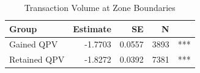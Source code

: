 \begin{table}

\caption{Transaction Volume at Zone Boundaries}
\centering
\begin{tabular}[t]{lrrrl}
\toprule
Group & Estimate & SE & N & \\
\midrule
Gained QPV & -1.7703 & 0.0557 & 3893 & ***\\
Retained QPV & -1.8272 & 0.0392 & 7381 & ***\\
\bottomrule
\end{tabular}
\end{table}
